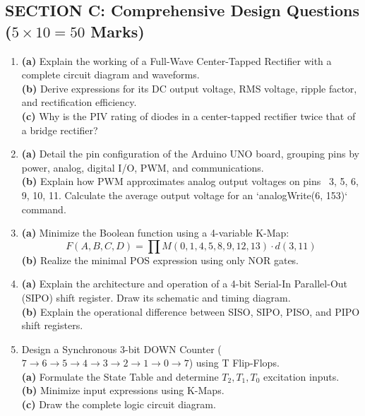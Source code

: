 \subsection*{SECTION C: Comprehensive Design Questions ($5 \times 10 = 50$ Marks)}
\begin{enumerate}[label=\textbf{Q\arabic*.}, leftmargin=2em, start=18]
    \item \textbf{(a)} Explain the working of a Full-Wave Center-Tapped Rectifier with a complete circuit diagram and waveforms. \\
    \textbf{(b)} Derive expressions for its DC output voltage, RMS voltage, ripple factor, and rectification efficiency. \\
    \textbf{(c)} Why is the PIV rating of diodes in a center-tapped rectifier twice that of a bridge rectifier?
    
    \item \textbf{(a)} Detail the pin configuration of the Arduino UNO board, grouping pins by power, analog, digital I/O, PWM, and communications. \\
    \textbf{(b)} Explain how PWM approximates analog output voltages on pins ~3, 5, 6, 9, 10, 11. Calculate the average output voltage for an `analogWrite(6, 153)` command.
    
    \item \textbf{(a)} Minimize the Boolean function using a 4-variable K-Map:
    $$F(A,B,C,D) = \prod M(0, 1, 4, 5, 8, 9, 12, 13) \cdot d(3, 11)$$
    \textbf{(b)} Realize the minimal POS expression using only NOR gates.
    
    \item \textbf{(a)} Explain the architecture and operation of a 4-bit Serial-In Parallel-Out (SIPO) shift register. Draw its schematic and timing diagram. \\
    \textbf{(b)} Explain the operational difference between SISO, SIPO, PISO, and PIPO shift registers.
    
    \item Design a Synchronous 3-bit DOWN Counter ($7 \rightarrow 6 \rightarrow 5 \rightarrow 4 \rightarrow 3 \rightarrow 2 \rightarrow 1 \rightarrow 0 \rightarrow 7$) using T Flip-Flops. \\
    \textbf{(a)} Formulate the State Table and determine $T_2, T_1, T_0$ excitation inputs. \\
    \textbf{(b)} Minimize input expressions using K-Maps. \\
    \textbf{(c)} Draw the complete logic circuit diagram.
\end{enumerate}

